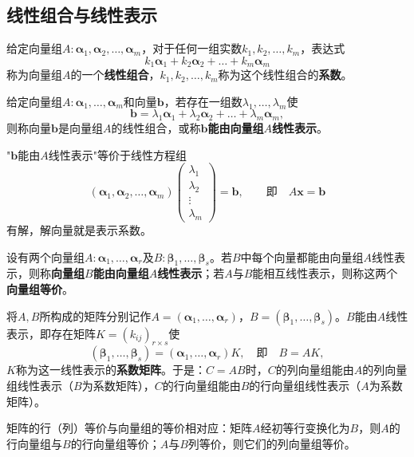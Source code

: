 \subsection{线性组合与线性表示}
\begin{definition}
给定向量组$A:\boldsymbol{\alpha}_1,\boldsymbol{\alpha}_2,\dots,\boldsymbol{\alpha}_m$，对于任何一组实数$k_1,k_2,\dots,k_m$，表达式
\[
k_1\boldsymbol{\alpha}_1+k_2\boldsymbol{\alpha}_2+\dots+k_m\boldsymbol{\alpha}_m
\]
称为向量组$A$的一个\textbf{线性组合}，$k_1,k_2,\dots,k_m$称为这个线性组合的\textbf{系数}。

给定向量组$A:\boldsymbol{\alpha}_1,\dots,\boldsymbol{\alpha}_m$和向量$\boldsymbol{b}$，若存在一组数$\lambda_1,\dots,\lambda_m$使
\[
\boldsymbol{b}=\lambda_1\boldsymbol{\alpha}_1+\lambda_2\boldsymbol{\alpha}_2+\dots+\lambda_m\boldsymbol{\alpha}_m,
\]
则称向量$\boldsymbol{b}$是向量组$A$的线性组合，或称$\boldsymbol{b}$\textbf{能由向量组$A$线性表示}。
\end{definition}

"$\boldsymbol{b}$能由$A$线性表示"等价于线性方程组
\[
(\boldsymbol{\alpha}_1,\boldsymbol{\alpha}_2,\dots,\boldsymbol{\alpha}_m)
\begin{pmatrix}\lambda_1\\ \lambda_2\\ \vdots\\ \lambda_m\end{pmatrix}
=\boldsymbol{b},\qquad\text{即}\quad A\boldsymbol{x}=\boldsymbol{b}
\]
有解，解向量就是表示系数。

\begin{definition}[向量组的线性表示与等价]
设有两个向量组$A:\boldsymbol{\alpha}_1,\dots,\boldsymbol{\alpha}_r$及$B:\boldsymbol{\beta}_1,\dots,\boldsymbol{\beta}_s$。若$B$中每个向量都能由向量组$A$线性表示，则称\textbf{向量组$B$能由向量组$A$线性表示}；若$A$与$B$能相互线性表示，则称这两个\textbf{向量组等价}。
\end{definition}

将$A,B$所构成的矩阵分别记作$A=(\boldsymbol{\alpha}_1,\dots,\boldsymbol{\alpha}_r)$，$B=(\boldsymbol{\beta}_1,\dots,\boldsymbol{\beta}_s)$。$B$能由$A$线性表示，即存在矩阵$K=(k_{ij})_{r\times s}$使
\[
(\boldsymbol{\beta}_1,\dots,\boldsymbol{\beta}_s)=(\boldsymbol{\alpha}_1,\dots,\boldsymbol{\alpha}_r)K,
\quad\text{即}\quad B=AK,
\]
$K$称为这一线性表示的\textbf{系数矩阵}。于是：$C=AB$时，$C$的列向量组能由$A$的列向量组线性表示（$B$为系数矩阵），$C$的行向量组能由$B$的行向量组线性表示（$A$为系数矩阵）。

矩阵的行（列）等价与向量组的等价相对应：矩阵$A$经初等行变换化为$B$，则$A$的行向量组与$B$的行向量组等价；$A$与$B$列等价，则它们的列向量组等价。

